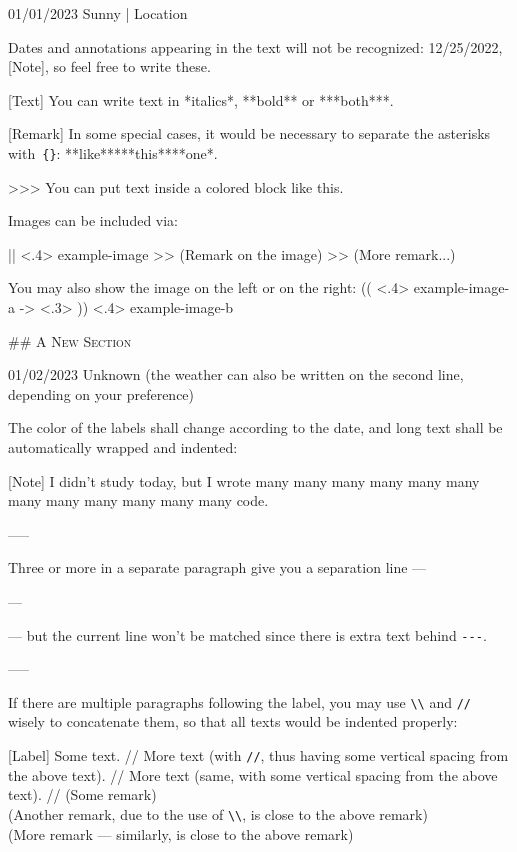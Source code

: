 \documentclass[11pt, paperstyle=light yellow, color entry, month-day-year,
  title in boldface, title in sffamily, use style = classical]{jwjournal}
\begin{document}
01/01/2023 Sunny | Location

  Dates and annotations appearing in the text will not be recognized: 12/25/2022, [Note], so feel free to write these.

  [Text] You can write text in *italics*, **bold** or ***both***.

  [Remark] In some special cases, it would be necessary to separate the asterisks with~\texttt{\{\}}: **like**{}***this***{}*one*.

  >>> You can put text inside a colored block like this.

  Images can be included via:

  || <.4> {example-image} %
  >> (Remark on the image)
  >> (More remark...)

  You may also show the image on the left or on the right:
  (( <.4> {example-image-a} %
  -> <.3> %
  )) <.4> {example-image-b} %


## {\textsc{A New Section}}

01/02/2023
Unknown (the weather can also be written on the second line, depending on your preference)

  The color of the labels shall change according to the date, and long text shall be automatically wrapped and indented:

  [Note] I didn't study today, but I wrote many many many many many many many many many many many many code.

  -----

  Three or more \textquote{\texttt{-}} in a separate paragraph give you a separation line ---

  ---

  --- but the current line won't be matched since there is extra text behind \texttt{-}\texttt{-}\texttt{-}.

  -----

  If there are multiple paragraphs following the label, you may use \texttt{\textbackslash\textbackslash} and \texttt{\slash\slash} wisely to concatenate them, so that all texts would be indented properly:

  [Label] Some text.
    //
    More text (with \texttt{\slash\slash}, thus having some vertical spacing from the above text).
    //
    More text (same, with some vertical spacing from the above text).
    //
    (Some remark)
    \\
    (Another remark, due to the use of \texttt{\textbackslash\textbackslash}, is close to the above remark)
    \\
    (More remark --- similarly, is close to the above remark)
\end{document}
